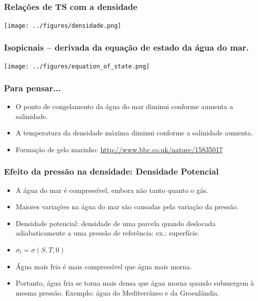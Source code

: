 \begin{frame}
\frametitle{Relações de TS com a densidade}
    \begin{center}
        \texttt{[image: ../figures/densidade.png]}
    \end{center}
\end{frame}

\begin{frame}
\frametitle{\small{Isopicnais -- derivada da equação de estado da água do mar.}}
    \begin{center}
        \texttt{[image: ../figures/equation\_of\_state.png]}
    \end{center}
\end{frame}


\begin{frame}
\frametitle{Para pensar...}
    \footnotesize{
    \begin{itemize}[<+-| alert@+>]
    \item O ponto de congelamento da água do mar diminui conforme aumenta a
          salinidade.
    \item A temperatura da densidade máxima diminui conforme a
          salinidade aumenta.
    \item Formação de gelo marinho:
    \url{http://www.bbc.co.uk/nature/15835017}
    \end{itemize}
    }
\end{frame}


\begin{frame}
\frametitle{Efeito da pressão na densidade: Densidade Potencial}
    \footnotesize{
    \begin{itemize}[<+-| alert@+>]
    \item A água do mar é compressível, embora não tanto quanto o gás.
    \item Maiores variações na água do mar são causadas pela variação da
          pressão.
    \item Densidade potencial: densidade de uma parcela quando deslocada
          adiabaticamente a uma pressão de referência: ex.: superfície.
    \item $\sigma_t = \sigma(S, T, 0)$
    \item Água mais fria é mais compressível que água mais morna.
    \item Portanto, água fria se torna mais densa que água morna quando
          submergem à mesma pressão. Exemplo: água do Mediterrâneo e da
          Groenlândia.
    \end{itemize}
    }
\end{frame}


